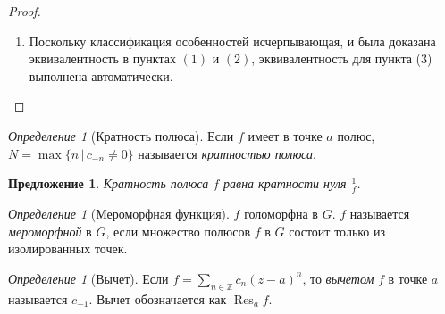 \documentclass[12pt]{article}
\newcommand{\Z}{\mathbb{Z}}
\newcommand{\Res}{\operatorname{Res}}
\newcommand{\Ra}{\Rightarrow}
\newcommand{\La}{\Leftarrow}
\newcounter{cnt}
\theoremstyle{thmnote}
\newtheorem{proposition}[cnt]{Предложение}
\theoremstyle{remark}
\theoremstyle{defnote}
\newtheorem{definition}[cnt]{Определение}
\begin{document}
\begin{proof}
\begin{enumerate}
        Поскольку формула для $c_n$ верна при любом $\varepsilon$, получаем, что при $n < d^*$ $c_n = 0$. Значит, количество ненулевых коэффициентов в главной части разложения $f$ не больше чем $d^*$.

        $\La$: \begin{equation*}
            f(z) = \sum_{n = -N}^{-1} c_n (z - a)^n + \sum_{n = 0}^{+\infty} c_n (z - a)^n \Ra |f(z)| \underset{z \to a}{\longrightarrow} +\infty
        \end{equation*}
        \item Поскольку классификация особенностей исчерпывающая, и была доказана эквивалентность в пунктах $(1)$ и $(2)$, эквивалентность для пункта (3) выполнена автоматически.
    \end{enumerate}
\end{proof}

\begin{definition}[Кратность полюса]
    Если $f$ имеет в точке $a$ полюс, $N = \max\{n \,|\, c_{-n} \neq 0\}$ называется \textit{кратностью полюса}.
\end{definition}

\begin{proposition}
    Кратность полюса $f$ равна кратности нуля $\frac{1}{f}$.
\end{proposition}

\begin{definition}[Мероморфная функция]
    $f$ голоморфна в $G$. $f$ называется \textit{мероморфной} в $G$, если множество полюсов $f$ в $G$ состоит только из изолированных точек.
\end{definition}

\begin{definition}[Вычет]
    Если $f = \sum_{n \in \Z} c_n (z - a)^n$, то \textit{вычетом} $f$ в точке $a$ называется $c_{-1}$. Вычет обозначается как $\Res_a f$.
\end{definition}
\end{document}
